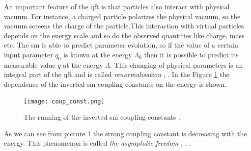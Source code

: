 An important feature of the \gls{qft} is that particles also interact with physical vacuum. For instance, a charged particle polarizes the physical vacuum, so the vacuum screens the charge of the particle\cite{Schwinger_polariz}.This interaction with virtual particles depends on the energy scale and so do the observed quantities like charge, mass etc. The \gls{sm} is able to predict parameter evolution, so if the value of a certain input parameter $q_0$ is known at the energy $\Lambda_0$ then it is possible to predict its measurable value $q$ at the energy $\Lambda$. This changing of physical parameters is an integral part of the \gls{qft} and is called \textit{renormalisation} \cite{bogol}, \cite{Glashow:1959wxa}. In the Figure \ref{fig::running} the dependence of the inverted \gls{sm} coupling constants on the energy is shown. \\

	 \begin{figure}[htpb]
	 	\centering
	\texttt{[image: coup\_const.png]}
	\caption{The running of the inverted \gls{sm} coupling constants \cite{coupl_wiki}. }
	\label{fig::running}
	\end{figure}
As we can see from picture \ref{fig::running} the strong coupling constant is decreasing with the energy. This phenomenon is called \textit{the asymptotic freedom} \cite{Gross}, \cite{Politzer}, \cite{Vanyashin}.



